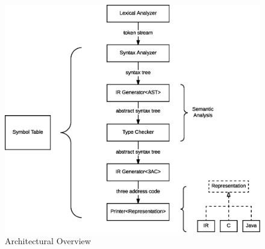 \begin{figure}[H]
  \centering
  \includegraphics[width=.9\columnwidth]{img/eps/architecture.eps}
  \caption{Architectural Overview}
  \label{fig:arch-ovw}
\end{figure}